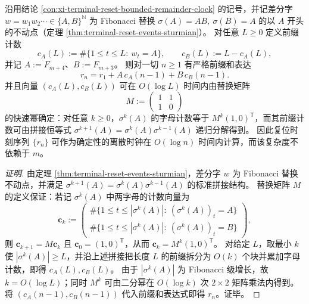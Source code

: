 \begin{conclusion}\label{con:xi-terminal-reset-clock-logtime}
沿用结论 \ref{con:xi-terminal-reset-bounded-remainder-clock} 的记号，并记差分字
\(
w=w_1w_2\cdots\in\{A,B\}^{\mathbb N}
\)
为 Fibonacci 替换
\(
\sigma(A)=AB,\ \sigma(B)=A
\)
的以 \(A\) 开头的不动点（定理 \ref{thm:terminal-reset-events-sturmian}）。
对任意 \(L\ge 0\) 定义前缀计数
\[
c_A(L):=\#\{1\le t\le L:\ w_t=A\},\qquad
c_B(L):=L-c_A(L),
\]
并记 \(A:=F_{m+4}\)、\(B:=F_{m+3}\)。
则对一切 \(n\ge 1\) 有严格前缀和表达
\[
r_n=r_1+A\,c_A(n-1)+B\,c_B(n-1).
\]
并且向量 \((c_A(L),c_B(L))\) 可在 \(O(\log L)\) 时间内由替换矩阵
\[
M:=\begin{pmatrix}1&1\\ 1&0\end{pmatrix}
\]
的快速幂确定：对任意 \(k\ge 0\)，\(\sigma^k(A)\) 的字母计数等于 \(M^k(1,0)^{\mathsf T}\)，而其前缀计数可由拼接恒等式
\(
\sigma^{k+1}(A)=\sigma^k(A)\sigma^{k-1}(A)
\)
递归分解得到。
因此复位时刻序列 \(\{r_n\}\) 可作为确定性的离散时钟在 \(O(\log n)\) 时间内计算，而该复杂度不依赖于 \(m\)。
\end{conclusion}
\begin{proof}[证明]
由定理 \ref{thm:terminal-reset-events-sturmian}，差分字 \(w\) 为 Fibonacci 替换不动点，并满足
\(
\sigma^{k+1}(A)=\sigma^k(A)\sigma^{k-1}(A)
\)
的标准拼接结构。
替换矩阵 \(M\) 的定义保证：若记 \(\sigma^k(A)\) 中两字母的计数向量为
\[
\mathbf c_k:=
\begin{pmatrix}
\#\{1\le t\le |\sigma^k(A)|:\ (\sigma^k(A))_t=A\}\\
\#\{1\le t\le |\sigma^k(A)|:\ (\sigma^k(A))_t=B\}
\end{pmatrix},
\]
则 \(\mathbf c_{k+1}=M\mathbf c_k\) 且 \(\mathbf c_0=(1,0)^{\mathsf T}\)，从而 \(\mathbf c_k=M^k(1,0)^{\mathsf T}\)。
对给定 \(L\)，取最小 \(k\) 使 \(|\sigma^k(A)|\ge L\)，并沿上述拼接把长度 \(L\) 的前缀拆分为 \(O(k)\) 个块并累加字母计数，即得 \(c_A(L),c_B(L)\)。
由于 \(|\sigma^k(A)|\) 为 Fibonacci 级增长，故 \(k=O(\log L)\)；同时 \(M^k\) 可由二分幂在 \(O(\log k)\) 次 \(2\times 2\) 矩阵乘法内得到。
将 \((c_A(n-1),c_B(n-1))\) 代入前缀和表达式即得 \(r_n\)。证毕。
\end{proof}


